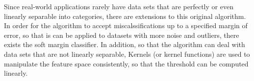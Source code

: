 Since real-world applications rarely have data sets that are perfectly or even linearly separable into categories, there are extensions to this original algorithm. In order for the algorithm to accept miscalssifications up to a specified margin of error, so that is can be applied to datasets with more noise and outliers, there exists the soft margin classifier. In addition, so that the algorithm can deal with data sets that are not linearly separable, Kernels (or kernel functions) are used to manipulate the feature space consistently, so that the threshold can be computed linearly. \cite{mammone2009support}

